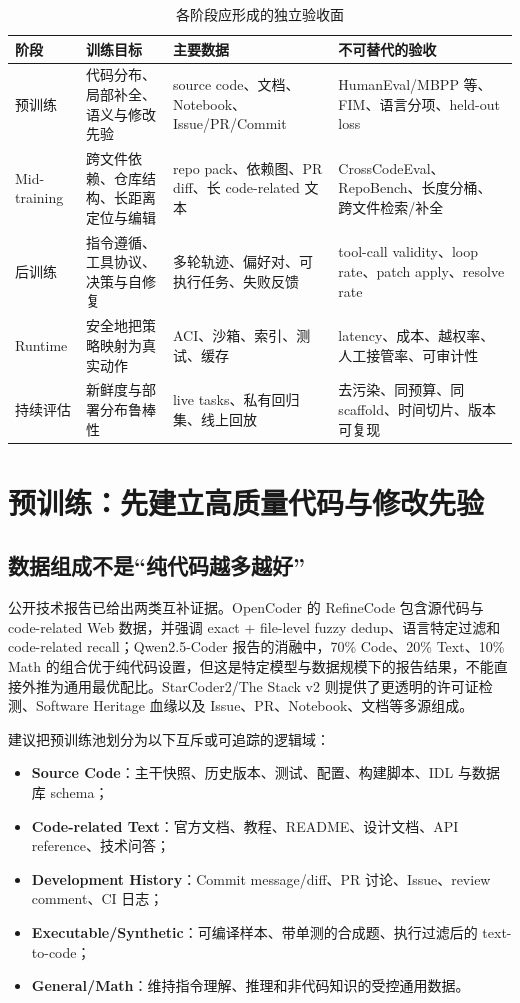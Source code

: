 \documentclass[10pt,a4paper,UTF8,fontset=none]{ctexart}
\begin{document}
\begin{table}[htbp]
\centering
\caption{各阶段应形成的独立验收面}
\label{tab:surfaces}
\small
\begin{tabularx}{\textwidth}{p{2.6cm}YYY}
\toprule
阶段 & 训练目标 & 主要数据 & 不可替代的验收 \\
\midrule
预训练 & 代码分布、局部补全、语义与修改先验 & source code、文档、Notebook、Issue/PR/Commit & HumanEval/MBPP 等、FIM、语言分项、held-out loss \\
Mid-training & 跨文件依赖、仓库结构、长距离定位与编辑 & repo pack、依赖图、PR diff、长 code-related 文本 & CrossCodeEval、RepoBench、长度分桶、跨文件检索/补全 \\
后训练 & 指令遵循、工具协议、决策与自修复 & 多轮轨迹、偏好对、可执行任务、失败反馈 & tool-call validity、loop rate、patch apply、resolve rate \\
Runtime & 安全地把策略映射为真实动作 & ACI、沙箱、索引、测试、缓存 & latency、成本、越权率、人工接管率、可审计性 \\
持续评估 & 新鲜度与部署分布鲁棒性 & live tasks、私有回归集、线上回放 & 去污染、同预算、同 scaffold、时间切片、版本可复现 \\
\bottomrule
\end{tabularx}
\end{table}

\section{预训练：先建立高质量代码与修改先验}

\subsection{数据组成不是“纯代码越多越好”}

公开技术报告已给出两类互补证据。OpenCoder 的 RefineCode 包含源代码与 code-related Web 数据，并强调 exact + file-level fuzzy dedup、语言特定过滤和 code-related recall\cite{huang2024opencoder}；Qwen2.5-Coder 报告的消融中，70\% Code、20\% Text、10\% Math 的组合优于纯代码设置，但这是特定模型与数据规模下的报告结果，不能直接外推为通用最优配比\cite{hui2024qwen25coder}。StarCoder2/The Stack v2 则提供了更透明的许可证检测、Software Heritage 血缘以及 Issue、PR、Notebook、文档等多源组成\cite{lozhkov2024starcoder2}。

建议把预训练池划分为以下互斥或可追踪的逻辑域：

\begin{itemize}
  \item \textbf{Source Code}：主干快照、历史版本、测试、配置、构建脚本、IDL 与数据库 schema；
  \item \textbf{Code-related Text}：官方文档、教程、README、设计文档、API reference、技术问答；
  \item \textbf{Development History}：Commit message/diff、PR 讨论、Issue、review comment、CI 日志；
  \item \textbf{Executable/Synthetic}：可编译样本、带单测的合成题、执行过滤后的 text-to-code；
  \item \textbf{General/Math}：维持指令理解、推理和非代码知识的受控通用数据。
\end{itemize}
\end{document}
